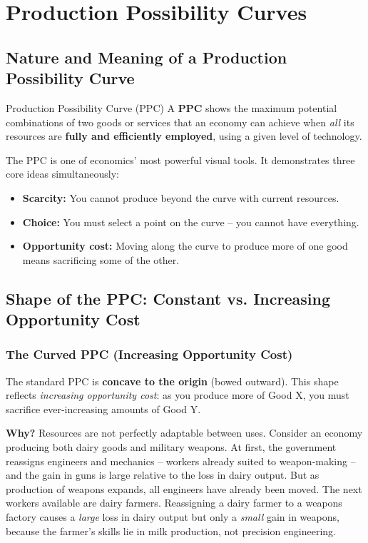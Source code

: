 \documentclass[11pt, a4paper, twoside]{book}
\begin{document}
\section{Production Possibility Curves}



\subsection{Nature and Meaning of a Production Possibility Curve}

\begin{keyterm}{Production Possibility Curve (PPC)}
A \textbf{PPC} shows the maximum potential combinations of two goods or services that an economy can achieve when \emph{all} its resources are \textbf{fully and efficiently employed}, using a given level of technology.
\end{keyterm}

The PPC is one of economics' most powerful visual tools. It demonstrates three core ideas simultaneously:
\begin{itemize}
  \item \textbf{Scarcity:} You cannot produce beyond the curve with current resources.
  \item \textbf{Choice:} You must select a point on the curve -- you cannot have everything.
  \item \textbf{Opportunity cost:} Moving along the curve to produce more of one good means sacrificing some of the other.
\end{itemize}

\subsection{Shape of the PPC: Constant vs. Increasing Opportunity Cost}

\subsubsection{The Curved PPC (Increasing Opportunity Cost)}

\begin{coreidea}
The standard PPC is \textbf{concave to the origin} (bowed outward). This shape reflects \emph{increasing opportunity cost}: as you produce more of Good X, you must sacrifice ever-increasing amounts of Good Y.
\end{coreidea}

\textbf{Why?} Resources are not perfectly adaptable between uses. Consider an economy producing both dairy goods and military weapons. At first, the government reassigns engineers and mechanics -- workers already suited to weapon-making -- and the gain in guns is large relative to the loss in dairy output. But as production of weapons expands, all engineers have already been moved. The next workers available are dairy farmers. Reassigning a dairy farmer to a weapons factory causes a \emph{large} loss in dairy output but only a \emph{small} gain in weapons, because the farmer's skills lie in milk production, not precision engineering.
\end{document}
